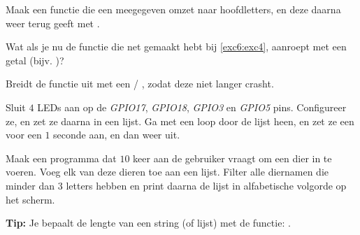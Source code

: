 \begin{exercise}
\label{exc6:exc4}
Maak een functie  die een meegegeven  omzet naar hoofdletters, en deze daarna weer terug geeft met . 
\end{exercise}

\begin{exercise}
Wat als je nu de functie die net gemaakt hebt bij \ref{exc6:exc4}, aanroept met een getal (bijv. )? 

Breidt de functie uit met een  / , zodat deze niet langer crasht. 
\end{exercise}

\begin{exercise}
Sluit $4$ LEDs aan op de \textit{GPIO17}, \textit{GPIO18}, \textit{GPIO3} en \textit{GPIO5} pins. Configureer ze, en zet ze daarna in een lijst. Ga met een loop door de lijst heen, en zet ze een voor een $1$ seconde aan, en dan weer uit.
\end{exercise}

\begin{exercise}
Maak een programma dat $10$ keer aan de gebruiker vraagt om een dier in te voeren. Voeg elk van deze dieren toe aan een lijst. Filter alle diernamen die minder dan $3$ letters hebben en print daarna de lijst in alfabetische volgorde op het scherm. 

\textbf{Tip:} Je bepaalt de lengte van een string (of lijst) met de functie: .
\end{exercise}
